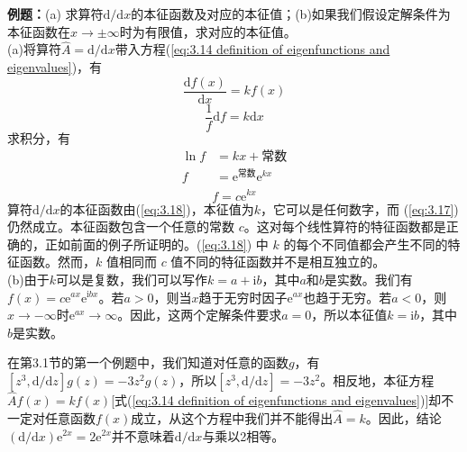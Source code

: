 	\begin{examplebox}
		\textbf{例题：}(a) 求算符$\mathrm{d}/\mathrm{d}x$的本征函数及对应的本征值；(b)如果我们假设定解条件为本征函数在$x \to \pm \infty$时为有限值，求对应的本征值。\\
		
		(a)将算符$\hat{A} = \mathrm{d}/\mathrm{d}x$带入方程(\ref{eq:3.14 definition of eigenfunctions and eigenvalues})，有
		\begin{equation}
			\frac{\mathrm{d}f\left(x\right)}{\mathrm{d}x} = kf\left(x\right)
			\label{eq:3.17}
		\end{equation}
		\begin{equation*}
			\frac{1}{f}\mathrm{d}f = k \mathrm{d}x
		\end{equation*}
		求积分，有
		\begin{equation*}
			\begin{aligned}
				\ln f & = kx + \text{常数} \\
				f & = \mathrm{e}^{\text{常数}}\mathrm{e}^{kx} \\
			\end{aligned}
		\end{equation*}
		\begin{equation}
			f  = c\mathrm{e}^{kx}
			\label{eq:3.18}
		\end{equation}
		算符$\mathrm{d}/\mathrm{d}x$的本征函数由(\ref{eq:3.18})，本征值为$k$，它可以是任何数字，而 (\ref{eq:3.17}) 仍然成立。本征函数包含一个任意的常数 $c$。这对每个线性算符的特征函数都是正确的，正如前面的例子所证明的。(\ref{eq:3.18}) 中 $k$ 的每个不同值都会产生不同的特征函数。然而，$k$ 值相同而 $c$ 值不同的特征函数并不是相互独立的。\\
		(b)由于$k$可以是复数，我们可以写作$k = a+\mathrm{i}b$，其中$a$和$b$是实数。我们有$f\left(x\right) = c\mathrm{e}^{ax}\mathrm{e}^{\mathrm{i}bx}$。若$a>0$，则当$x$趋于无穷时因子$\mathrm{e}^{ax}$也趋于无穷。若$a<0$，则$x \to - \infty$时$\mathrm{e}^{ax} \to \infty$。因此，这两个定解条件要求$a=0$，所以本征值$k=\mathrm{i}b$，其中$b$是实数。
	\end{examplebox}

	在第3.1节的第一个例题中，我们知道对任意的函数$g$，有$\left[z^3,\mathrm{d}/\mathrm{d}z\right]g\left(z\right) = -3z^2g\left(z\right)$，所以$\left[z^3,\mathrm{d}/\mathrm{d}z\right] = -3z^2$。相反地，本征方程$\hat{A}f\left(x\right) = kf\left(x\right)$[式(\ref{eq:3.14 definition of eigenfunctions and eigenvalues})]却不一定对任意函数$f\left(x\right)$成立，从这个方程中我们并不能得出$\hat{A}=k$。因此，结论$\left(\mathrm{d}/\mathrm{d}x\right)\mathrm{e}^{2x} = 2\mathrm{e}^{2x}$并不意味着$\mathrm{d}/\mathrm{d}x$与乘以2相等。
	
